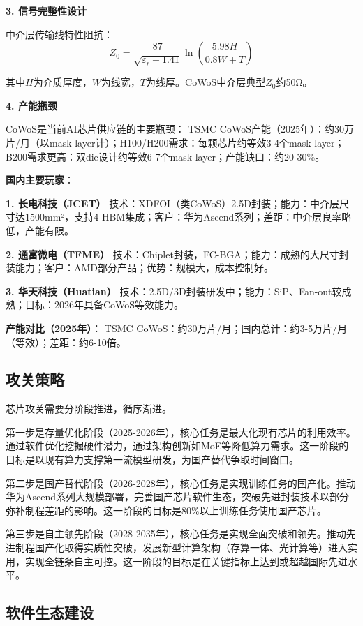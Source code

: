 \textbf{3. 信号完整性设计}

中介层传输线特性阻抗：
\begin{equation}
Z_0 = \frac{87}{\sqrt{\varepsilon_r + 1.41}} \ln\left(\frac{5.98H}{0.8W + T}\right)
\end{equation}

其中$H$为介质厚度，$W$为线宽，$T$为线厚。CoWoS中介层典型$Z_0$约50Ω。

\textbf{4. 产能瓶颈}

CoWoS是当前AI芯片供应链的主要瓶颈：
TSMC CoWoS产能（2025年）：约30万片/月（以mask layer计）；H100/H200需求：每颗芯片约等效3-4个mask layer；B200需求更高：双die设计约等效6-7个mask layer；产能缺口：约20-30\%。

\textbf{国内主要玩家}：

\textbf{1. 长电科技（JCET）}
技术：XDFOI（类CoWoS）2.5D封装；能力：中介层尺寸达1500mm²，支持4-HBM集成；客户：华为Ascend系列；差距：中介层良率略低，产能有限。

\textbf{2. 通富微电（TFME）}
技术：Chiplet封装，FC-BGA；能力：成熟的大尺寸封装能力；客户：AMD部分产品；优势：规模大，成本控制好。

\textbf{3. 华天科技（Huatian）}
技术：2.5D/3D封装研发中；能力：SiP、Fan-out较成熟；目标：2026年具备CoWoS等效能力。

\textbf{产能对比（2025年）}：
TSMC CoWoS：约30万片/月；国内总计：约3-5万片/月（等效）；差距：约6-10倍。

\subsection{攻关策略}

芯片攻关需要分阶段推进，循序渐进。

第一步是存量优化阶段（2025-2026年），核心任务是最大化现有芯片的利用效率。通过软件优化挖掘硬件潜力，通过架构创新如MoE等降低算力需求。这一阶段的目标是以现有算力支撑第一流模型研发，为国产替代争取时间窗口。

第二步是国产替代阶段（2026-2028年），核心任务是实现训练任务的国产化。推动华为Ascend系列大规模部署，完善国产芯片软件生态，突破先进封装技术以部分弥补制程差距的影响。这一阶段的目标是80\%以上训练任务使用国产芯片。

第三步是自主领先阶段（2028-2035年），核心任务是实现全面突破和领先。推动先进制程国产化取得实质性突破，发展新型计算架构（存算一体、光计算等）进入实用，实现全链条自主可控。这一阶段的目标是在关键指标上达到或超越国际先进水平。

\subsection{软件生态建设}

